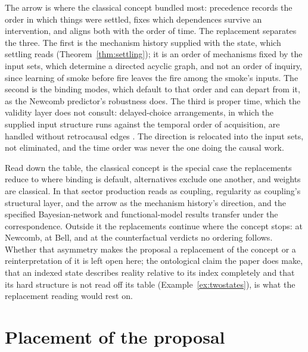 \documentclass[11pt]{article}
\begin{document}
\noindent The arrow is where the classical concept bundled most: precedence records the order in which things were settled, fixes which dependences survive an intervention, and aligns both with the order of time. The replacement separates the three. The first is the mechanism history supplied with the state, which settling reads (Theorem~\ref{thm:settling}); it is an order of mechanisms fixed by the input sets, which determine a directed acyclic graph, and not an order of inquiry, since learning of smoke before fire leaves the fire among the smoke's inputs. The second is the binding modes, which default to that order and can depart from it, as the Newcomb predictor's robustness does. The third is proper time, which the validity layer does not consult: delayed-choice arrangements, in which the supplied input structure runs against the temporal order of acquisition, are handled without retrocausal edges \cite{Aethus}. The direction is relocated into the input sets, not eliminated, and the time order was never the one doing the causal work.

\noindent Read down the table, the classical concept is the special case the replacements reduce to where binding is default, alternatives exclude one another, and weights are classical. In that sector production reads as coupling, regularity as coupling's structural layer, and the arrow as the mechanism history's direction, and the specified Bayesian-network and functional-model results transfer under the correspondence. Outside it the replacements continue where the concept stops: at Newcomb, at Bell, and at the counterfactual verdicts no ordering follows. Whether that asymmetry makes the proposal a replacement of the concept or a reinterpretation of it is left open here; the ontological claim the paper does make, that an indexed state describes reality relative to its index completely and that its hard structure is not read off its table (Example~\ref{ex:twostates}), is what the replacement reading would rest on.

\section{Placement of the proposal}
\label{sec:dissolution}
\end{document}
